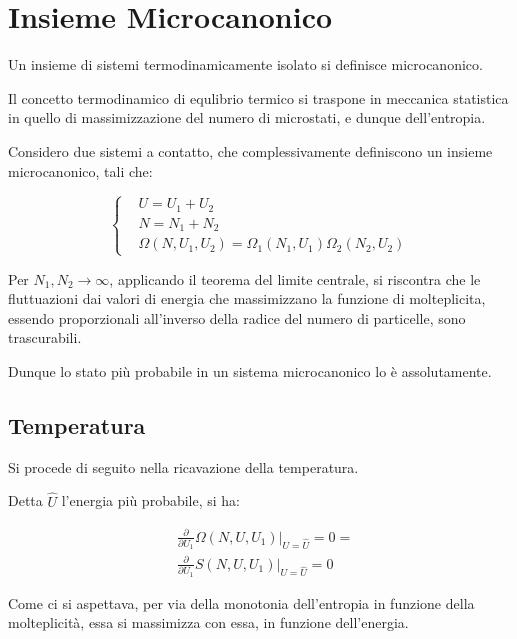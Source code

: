 \documentclass{article}
\begin{document}
\section{Insieme Microcanonico}
Un insieme di sistemi termodinamicamente isolato si definisce microcanonico.

Il concetto termodinamico di equlibrio termico si traspone in meccanica statistica in quello di massimizzazione del numero di microstati, e dunque dell'entropia.

Considero due sistemi a contatto, che complessivamente definiscono un insieme microcanonico, tali che:

\begin{equation}
    \left\{
    \begin{aligned}
         & U=U_1+U_2                                               \\
         & N=N_1+N_2                                               \\
         & \Omega(N,U_1,U_2) = \Omega_1(N_1,U_1) \Omega_2(N_2,U_2)
    \end{aligned}
    \right.
\end{equation}

Per $N_1, N_2 \rightarrow \infty$, applicando il teorema del limite centrale, si riscontra che le fluttuazioni dai valori di energia che
massimizzano la funzione di molteplicita, essendo proporzionali all'inverso della radice del numero di particelle, sono trascurabili.

Dunque lo stato più probabile in un sistema microcanonico lo è assolutamente.

\subsection{Temperatura}
Si procede di seguito nella ricavazione della temperatura.

Detta $\hat{U}$ l'energia più probabile, si ha:

\begin{equation}
    \begin{aligned}
         & \frac{\partial}{\partial U_1}\Omega(N,U,U_1)|_{U=\hat{U}} = 0 = \\
         & \frac{\partial}{\partial U_1}S(N,U,U_1)|_{U=\hat{U}} = 0
    \end{aligned}
\end{equation}

Come ci si aspettava, per via della monotonia dell'entropia in funzione della molteplicità, essa si massimizza con essa, in funzione dell'energia.
\end{document}
